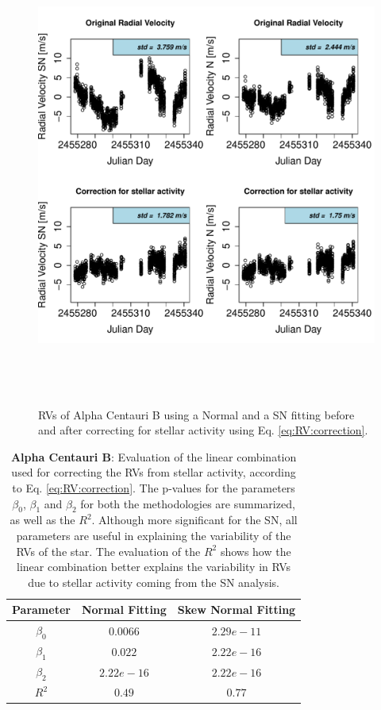 \documentclass[11pt, oneside]{article}
\begin{document}
\begin{figure}[htbp]
   \centering
\includegraphics[height = 6in]{HD12862_[3]CorrectionActivity_RadialVelocity_vs_time.pdf} 
   \caption{RVs of Alpha Centauri B using a Normal and a SN fitting before and after correcting for stellar activity using Eq. \ref{eq:RV:correction}.}
   \label{fig:alphacent:correctionRV}
\end{figure}

\begin{table}[!t]
\begin{tabular}{|c|c|c|}
\hline
Parameter          & Normal Fitting         &   Skew Normal Fitting \\
\hline
$\beta_{0}$            &    $0.0066$    & $2.29e-11$ \\
\hline
$\beta_{1}$            &    $0.022$    & $2.22e-16$ \\
\hline
$\beta_{2}$            &     $2.22e-16$   &  $ 2.22e-16 $ \\
\hline
$R^{2}$      &     $0.49$    &  $0.77$   \\
\hline
\end{tabular}
\caption{\textbf{Alpha Centauri B}: Evaluation of the linear combination used for correcting the RVs from stellar activity, according to Eq. \ref{eq:RV:correction}. The p-values for the parameters $\beta_{0}$, $\beta_{1}$ and $\beta_{2}$ for both the methodologies are summarized, as well as the $R^2$. Although more significant for the SN, all parameters are useful in explaining the variability of the RVs of the star. The evaluation of the $R^2$ shows how the linear combination better explains the variability in RVs due to stellar activity coming from the SN analysis.}
\label{table:alfa:test}
\end{table}
\end{document}
